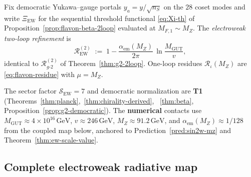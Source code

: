 \begin{definition}\label{def:ew-coset-portal}
Fix democratic Yukawa--gauge portals $y_a=y/\sqrt{n_S}$ on the $28$ coset
modes and write $\Xi_{\mathrm{EW}}$ for the sequential threshold functional
\eqref{eq:Xi-th} of Proposition~\ref{prop:flavon-beta-2loop} evaluated at
$M_{F,1}\sim M_Z$. The \emph{electroweak two-loop refinement} is
\begin{equation}\label{eq:ew-2loop-factor}
  \mathcal{R}_{\mathrm{EW}}^{(2)}
  \;:=\;
  1 - \frac{\alpha_{\mathrm{em}}(M_Z)}{2\pi}\,
  \ln\!\frac{M_{\mathrm{GUT}}}{v},
\end{equation}
identical to $\mathcal{R}_{g\text{-}2}^{(2)}$ of Theorem~\ref{thm:g2-2loop}.
One-loop residues $\mathcal{R}_\iota(M_Z)$ are \eqref{eq:flavon-residue} with
$\mu=M_Z$.
\end{definition}

\begin{remark}
The sector factor $\mathcal{S}_{\mathrm{EW}}=7$ and democratic normalization
are \textbf{T1} (Theorems~\ref{thm:planck},~\ref{thm:chirality-derived},
~\ref{thm:beta}, Proposition~\ref{prop:g2-democratic}). The
\textbf{numerical} contacts use $M_{\mathrm{GUT}}\approx4\times10^{16}\,\mathrm{GeV}$,
$v\approx246\,\mathrm{GeV}$, $M_Z\approx91.2\,\mathrm{GeV}$, and
$\alpha_{\mathrm{em}}(M_Z)\approx1/128$ from the coupled map below, anchored
to Prediction~\ref{pred:sin2w-mz} and Theorem~\ref{thm:ew-scale-value}.
\end{remark}

\subsection{Complete electroweak radiative map}
\label{sec:ew-precision:complete}

